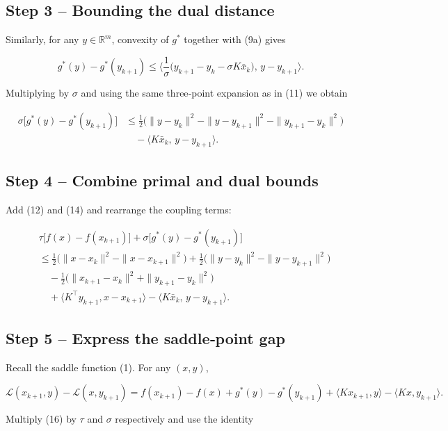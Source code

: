 \documentclass{article}
\begin{document}
\subsection*{Step 3 – Bounding the dual distance}
Similarly, for any $y\in\mathbb{R}^{m}$, convexity of $g^{*}$ together with (9a) gives  

\[
g^{*}(y)-g^{*}(y_{k+1})
\le \Big\langle \frac{1}{\sigma}\bigl(y_{k+1}-y_{k}-\sigma K\bar x_{k}\bigr),\,y-y_{k+1}\Big\rangle. \tag{13}
\]

Multiplying by $\sigma$ and using the same three‑point expansion as in (11) we obtain  

\[
\begin{aligned}
\sigma\bigl[g^{*}(y)-g^{*}(y_{k+1})\bigr]
&\le \tfrac12\bigl(\|y-y_{k}\|^{2}-\|y-y_{k+1}\|^{2}-\|y_{k+1}-y_{k}\|^{2}\bigr) \\
&\quad -\langle K\bar x_{k},\,y-y_{k+1}\rangle. \tag{14}
\end{aligned}
\]

\subsection*{Step 4 – Combine primal and dual bounds}
Add (12) and (14) and rearrange the coupling terms:

\[
\begin{aligned}
&\tau\bigl[f(x)-f(x_{k+1})\bigr]
+\sigma\bigl[g^{*}(y)-g^{*}(y_{k+1})\bigr] \\
&\le \tfrac12\bigl(\|x-x_{k}\|^{2}-\|x-x_{k+1}\|^{2}\bigr)
+\tfrac12\bigl(\|y-y_{k}\|^{2}-\|y-y_{k+1}\|^{2}\bigr) \\
&\quad -\tfrac12\bigl(\|x_{k+1}-x_{k}\|^{2}+\|y_{k+1}-y_{k}\|^{2}\bigr) \\
&\quad +\langle K^{\!\top}y_{k+1},x-x_{k+1}\rangle-\langle K\bar x_{k},\,y-y_{k+1}\rangle. \tag{15}
\end{aligned}
\]

\subsection*{Step 5 – Express the saddle‑point gap}
Recall the saddle function (1). For any $(x,y)$,

\[
\mathcal L(x_{k+1},y)-\mathcal L(x,y_{k+1})
= f(x_{k+1})-f(x) + g^{*}(y)-g^{*}(y_{k+1})
+ \langle Kx_{k+1},y\rangle-\langle Kx,y_{k+1}\rangle. \tag{16}
\]

Multiply (16) by $\tau$ and $\sigma$ respectively and use the identity  
\end{document}
